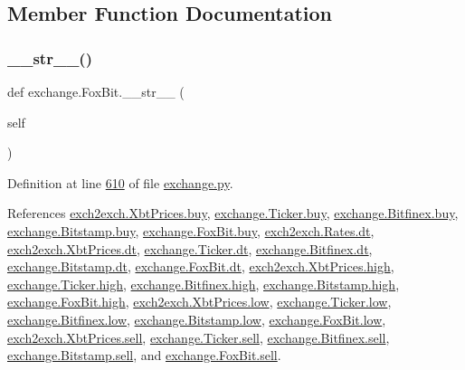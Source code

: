 \subsection{Member Function Documentation}
\mbox{\label{classexchange_1_1_fox_bit_ac21d1d06bf748dfd22ca35bc56a72e3b}} 
\subsubsection{\texorpdfstring{\+\_\+\+\_\+str\+\_\+\+\_\+()}{\_\_str\_\_()}}
{\footnotesize\ttfamily def exchange.\+Fox\+Bit.\+\_\+\+\_\+str\+\_\+\+\_\+ (\begin{DoxyParamCaption}\item[{}]{self }\end{DoxyParamCaption})}



Definition at line \hyperlink{exchange_8py_source_l00610}{610} of file \hyperlink{exchange_8py_source}{exchange.\+py}.



References \hyperlink{exch2exch_8py_source_l00059}{exch2exch.\+Xbt\+Prices.\+buy}, \hyperlink{exchange_8py_source_l00060}{exchange.\+Ticker.\+buy}, \hyperlink{exchange_8py_source_l00430}{exchange.\+Bitfinex.\+buy}, \hyperlink{exchange_8py_source_l00502}{exchange.\+Bitstamp.\+buy}, \hyperlink{exchange_8py_source_l00574}{exchange.\+Fox\+Bit.\+buy}, \hyperlink{exch2exch_8py_source_l00028}{exch2exch.\+Rates.\+dt}, \hyperlink{exch2exch_8py_source_l00057}{exch2exch.\+Xbt\+Prices.\+dt}, \hyperlink{exchange_8py_source_l00059}{exchange.\+Ticker.\+dt}, \hyperlink{exchange_8py_source_l00437}{exchange.\+Bitfinex.\+dt}, \hyperlink{exchange_8py_source_l00509}{exchange.\+Bitstamp.\+dt}, \hyperlink{exchange_8py_source_l00573}{exchange.\+Fox\+Bit.\+dt}, \hyperlink{exch2exch_8py_source_l00061}{exch2exch.\+Xbt\+Prices.\+high}, \hyperlink{exchange_8py_source_l00062}{exchange.\+Ticker.\+high}, \hyperlink{exchange_8py_source_l00432}{exchange.\+Bitfinex.\+high}, \hyperlink{exchange_8py_source_l00504}{exchange.\+Bitstamp.\+high}, \hyperlink{exchange_8py_source_l00576}{exchange.\+Fox\+Bit.\+high}, \hyperlink{exch2exch_8py_source_l00062}{exch2exch.\+Xbt\+Prices.\+low}, \hyperlink{exchange_8py_source_l00063}{exchange.\+Ticker.\+low}, \hyperlink{exchange_8py_source_l00433}{exchange.\+Bitfinex.\+low}, \hyperlink{exchange_8py_source_l00505}{exchange.\+Bitstamp.\+low}, \hyperlink{exchange_8py_source_l00577}{exchange.\+Fox\+Bit.\+low}, \hyperlink{exch2exch_8py_source_l00058}{exch2exch.\+Xbt\+Prices.\+sell}, \hyperlink{exchange_8py_source_l00061}{exchange.\+Ticker.\+sell}, \hyperlink{exchange_8py_source_l00431}{exchange.\+Bitfinex.\+sell}, \hyperlink{exchange_8py_source_l00503}{exchange.\+Bitstamp.\+sell}, and \hyperlink{exchange_8py_source_l00575}{exchange.\+Fox\+Bit.\+sell}.


